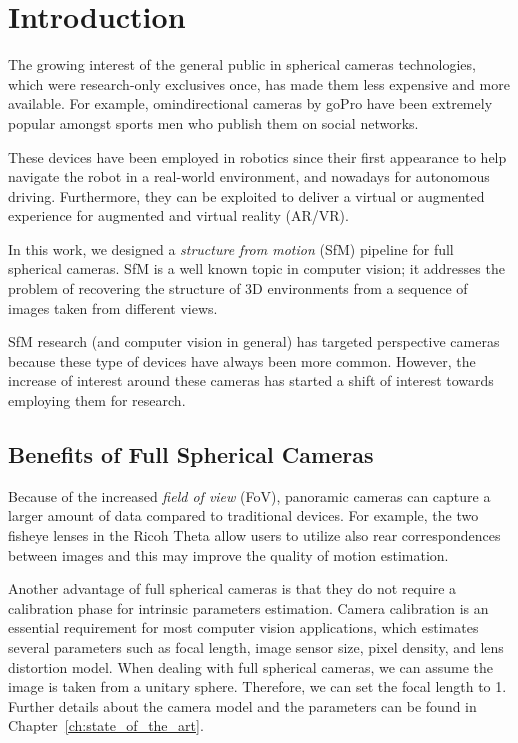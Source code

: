 \chapter{Introduction}
The growing interest of the general public in spherical cameras technologies, which were 
research-only exclusives once, has made them less expensive and more available. For example, omindirectional cameras by goPro have been extremely popular amongst sports men who publish them on social networks.

These devices have been employed in robotics since their first appearance to help navigate the robot in a real-world environment, and nowadays for autonomous driving. Furthermore, they can be exploited to deliver a virtual or augmented experience for augmented and virtual reality (AR/VR).

In this work, we designed a \textit{structure from motion} (SfM) pipeline for 
full spherical cameras. SfM is a well known topic in computer vision; it addresses the problem of 
recovering the structure of 3D environments from a sequence of images taken from different views.

SfM research (and computer vision in general) has targeted perspective cameras because these type of devices have always been more common. However, the increase of interest around these cameras has started a shift of interest towards employing them for research.

\section{Benefits of Full Spherical Cameras}
Because of the increased \textit{field of view} (FoV), panoramic cameras can capture a larger amount of data compared to traditional devices. For example, the two fisheye lenses in the Ricoh Theta allow users to utilize also rear correspondences between images and this may improve the quality of motion estimation.

Another advantage of full spherical cameras is that they do not require a calibration phase for intrinsic parameters estimation. Camera calibration is an essential requirement for most computer vision applications, which estimates several parameters such as focal length, image 
sensor size, pixel density, and lens distortion model. When dealing with full spherical cameras, we can assume the image is taken from a unitary sphere. Therefore, we can set the focal length to 1. Further details about the camera model and the parameters can be found in Chapter~\ref{ch:state_of_the_art}.

